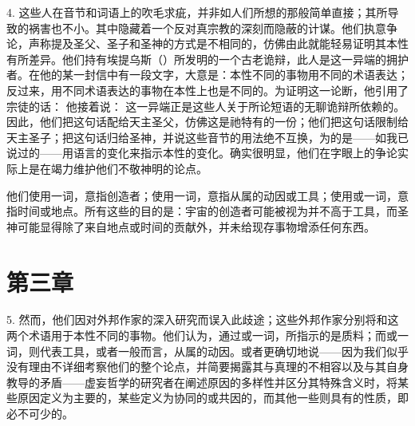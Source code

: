 4. 这些人在音节和词语上的吹毛求疵，并非如人们所想的那般简单直接；其所导致的祸害也不小。其中隐藏着一个反对真宗教的深刻而隐蔽的计谋。他们执意争论，声称提及圣父、圣子和圣神的方式是不相同的，仿佛由此就能轻易证明其本性有所差异。他们持有埃提乌斯（）所发明的一个古老诡辩，此人是这一异端的拥护者。在他的某一封信中有一段文字，大意是：本性不同的事物用不同的术语表达；反过来，用不同术语表达的事物在本性上也是不同的。为证明这一论断，他引用了宗徒的话：  他接着说： 这一异端正是这些人关于所论短语的无聊诡辩所依赖的。因此，他们把这句话配给天主圣父，仿佛这是祂特有的一份；他们把这句话限制给天主圣子；把这句话归给圣神，并说这些音节的用法绝不互换，为的是——如我已说过的——用语言的变化来指示本性的变化。确实很明显，他们在字眼上的争论实际上是在竭力维护他们不敬神明的论点。\par

他们使用一词，意指创造者；使用一词，意指从属的动因或工具；使用或一词，意指时间或地点。所有这些的目的是：宇宙的创造者可能被视为并不高于工具，而圣神可能显得除了来自地点或时间的贡献外，并未给现存事物增添任何东西。\par


\section{第三章}

\par

5. 然而，他们因对外邦作家的深入研究而误入此歧途；这些外邦作家分别将和这两个术语用于本性不同的事物。他们认为，通过或一词，所指示的是质料；而或一词，则代表工具，或者一般而言，从属的动因。或者更确切地说——因为我们似乎没有理由不详细考察他们的整个论点，并简要揭露其与真理的不相容以及与其自身教导的矛盾——虚妄哲学的研究者在阐述原因的多样性并区分其特殊含义时，将某些原因定义为主要的，某些定义为协同的或共因的，而其他一些则具有的性质，即必不可少的。\par

